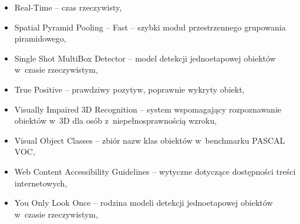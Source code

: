 \begin{itemize}
    \item[RT] Real-Time -- czas rzeczywisty,
    \item[SPPF] Spatial Pyramid Pooling -- Fast -- szybki moduł przestrzennego grupowania piramidowego,
    \item[SSD] Single Shot MultiBox Detector -- model detekcji jednoetapowej obiektów w~czasie rzeczywistym,
    \item[TP] True Positive -- prawdziwy pozytyw, poprawnie wykryty obiekt,
    \item[VI3DR] Visually Impaired 3D Recognition -- system wspomagający rozpoznawanie obiektów w~3D dla osób z~niepełnosprawnością wzroku,
    \item[VOC] Visual Object Classes -- zbiór nazw klas obiektów w~benchmarku PASCAL VOC,
    \item[WCAG] Web Content Accessibility Guidelines -- wytyczne dotyczące dostępności treści internetowych,
    \item[YOLO] You Only Look Once -- rodzina modeli detekcji jednoetapowej obiektów w~czasie rzeczywistym,
\end{itemize}
